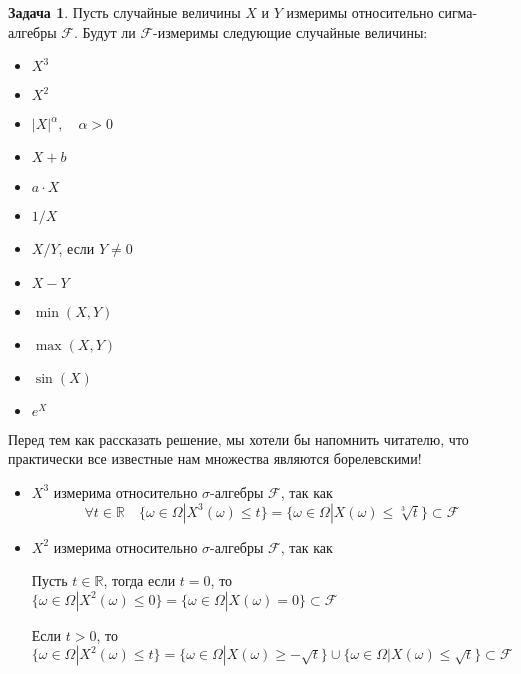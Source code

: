 \documentclass[pdftex, 12pt, a4paper]{article}
\def\R{\ensuremath{\mathbb{R}}} %
\def\F{\ensuremath{\mathcal{F}}} %
\def\s{\ensuremath{\sigma}}
\def \a{\alpha}
\def \Om{\Omega}
\def \om{\omega}
\renewcommand{\le}{\leqslant}
\renewcommand{\ge}{\geqslant}
\theoremstyle{definition} %
\newtheorem{problem}{Задача}
\numberwithin{problem}{section}
\numberwithin{blits}{section}
\begin{document}

\begin{problem}\label{upr:mesuarable}
Пусть случайные величины $X$ и $Y$ измеримы относительно сигма-алгебры $\F$. Будут ли $\F$-измеримы следующие случайные величины:
\begin{multicols}{2}
\begin{itemize}
\item $X^3$

\item $X^2$

\item $|X|^{\a}, \quad \a >0$

\item $X + b$

\item $a \cdot X$

\item $1/X$

\item $X/Y$, если $Y \neq 0$

\item $X-Y$ 

\item $\min(X,Y)$

\item $\max(X,Y)$

\item $\sin(X)$

\item $e^{X}$
\end{itemize}
\end{multicols}

\begin{sol}
Перед тем как рассказать решение, мы хотели бы напомнить читателю, что практически все известные нам множества являются борелевскими!

\begin{itemize}
\item $X^3$ измерима относительно \s-алгебры \F, так как 
\[\forall t \in \R \quad \{\om \in \Om | X^3(\om) \le t\} = \{\om \in \Om | X(\om) \le \sqrt[3]{t}\} \subset \F \]

\item $X^2$ измерима относительно \s-алгебры \F, так как

Пусть $t \in \R$, тогда если $t=0$, то $\{\om \in \Om | X^2(\om) \le 0 \} = \{\om \in \Om | X(\om) = 0 \} \subset \F$

Если $t > 0$, то $\{\om \in \Om | X^2(\om) \le t \} = \{\om \in \Om | X(\om) \ge -\sqrt{t} \} \cup \{\om\in \Om | X(\om) \le \sqrt{t} \} \subset \F$


\end{itemize}
\end{sol}
\end{problem}
\end{document}
